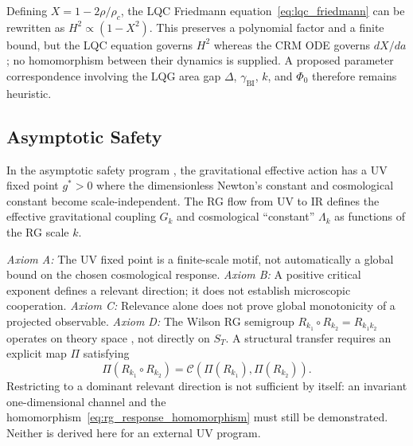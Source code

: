 \documentclass[aps,prd,twocolumn,superscriptaddress,nofootinbib]{revtex4-2}
\begin{document}
Defining $X = 1 - 2\rho/\rho_c$, the LQC Friedmann equation~\eqref{eq:lqc_friedmann} can be rewritten as $H^2 \propto (1 - X^2)$. This preserves a polynomial factor and a finite bound, but the LQC equation governs $H^2$ whereas the CRM ODE governs $dX/da$; no homomorphism between their dynamics is supplied. A proposed parameter correspondence involving the LQG area gap $\Delta$, $\gamma_{\mathrm{BI}}$, $k$, and $\Phi_0$ therefore remains heuristic.

\subsection{Asymptotic Safety}

In the asymptotic safety program \cite{Weinberg1979,Reuter1998,Percacci2017}, the gravitational effective action has a UV fixed point $g^* > 0$ where the dimensionless Newton's constant and cosmological constant become scale-independent. The RG flow from UV to IR defines the effective gravitational coupling $G_k$ and cosmological ``constant'' $\Lambda_k$ as functions of the RG scale $k$.

\textit{Axiom A:} The UV fixed point is a finite-scale motif, not automatically a global bound on the chosen cosmological response. \textit{Axiom B:} A positive critical exponent defines a relevant direction; it does not establish microscopic cooperation. \textit{Axiom C:} Relevance alone does not prove global monotonicity of a projected observable. \textit{Axiom D:} The Wilson RG semigroup $R_{k_1}\circ R_{k_2}=R_{k_1k_2}$ operates on theory space \cite{WilsonKogut1974}, not directly on $S_T$. A structural transfer requires an explicit map $\Pi$ satisfying
\begin{equation}
\Pi(R_{k_1}\circ R_{k_2})=\mathcal{C}\!\left(\Pi(R_{k_1}),\Pi(R_{k_2})\right).
\label{eq:rg_response_homomorphism}
\end{equation}
Restricting to a dominant relevant direction is not sufficient by itself: an invariant one-dimensional channel and the homomorphism~\eqref{eq:rg_response_homomorphism} must still be demonstrated. Neither is derived here for an external UV program.
\end{document}
